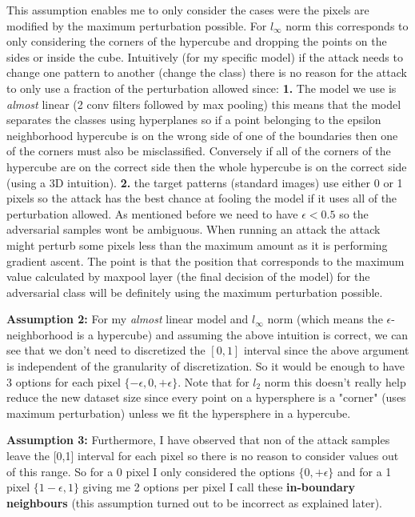 \documentclass[../thesis.tex]{subfiles}
\begin{document}
	 This assumption enables me to only consider the cases were the pixels are modified by the maximum perturbation possible. For $l_{\infty}$ norm this corresponds to only considering the corners of the hypercube and dropping the points on the sides or inside the cube. Intuitively (for my specific model) if the attack needs to change one pattern to another (change the class) there is no reason for the attack to only use a fraction of the perturbation allowed since: \textbf{1.} The model we use is \textit{almost} linear (2 conv filters followed by max pooling) this means that the model separates the classes using hyperplanes so if a point belonging to the epsilon neighborhood hypercube is on the wrong side of one of the boundaries then one of the corners must also be misclassified. Conversely if all of the corners of the hypercube are on the correct side then the whole hypercube is on the correct side (using a 3D intuition). \textbf{2.} the target patterns (standard images) use either 0 or 1 pixels so the attack has the best chance at fooling the model if it uses all of the perturbation allowed. As mentioned before we need to have $\epsilon < 0.5 $ so the adversarial samples wont be ambiguous. When running an attack the attack might perturb some pixels less than the maximum amount as it is performing gradient ascent. The point is that the position that corresponds to the maximum value calculated by maxpool layer (the final decision of the model) for the adversarial class will be definitely using the maximum perturbation possible. 
	
	\textbf{Assumption 2:} For my \textit{almost} linear model and $l_{\infty}$ norm (which means the $\epsilon$-neighborhood is a hypercube) and assuming the above intuition is correct, we can see that we don't need to discretized the $[0,1]$ interval since the above argument is independent of the granularity of discretization. So it would be enough to have 3 options for each pixel $\{-\epsilon, 0, +\epsilon\}$. Note that for $l_2$ norm this doesn't really help reduce the new dataset size since every point on a hypersphere is a "corner" (uses maximum perturbation) unless we fit the hypersphere in a hypercube.
	
	\label{assumption3}
	\textbf{Assumption 3:} Furthermore, I have observed that non of the attack samples leave the [0,1] interval for each pixel so there is no reason to consider values out of this range. So for a 0 pixel I only considered the options $\{0, +\epsilon\}$ and for a 1 pixel $\{1-\epsilon, 1\}$ giving me 2 options per pixel I call these \textbf{in-boundary neighbours} (this assumption turned out to be incorrect as explained later).
	
\end{document}
